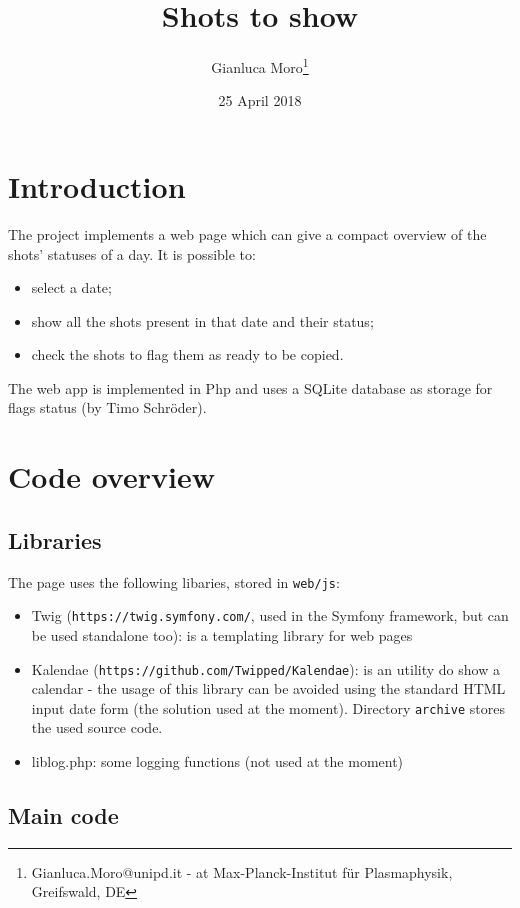\documentclass[12pt]{article}
\title{Shots to show}
\author{Gianluca Moro\footnote{Gianluca.Moro@unipd.it - at Max-Planck-Institut f\"ur Plasmaphysik, Greifswald, DE}}
\date{25 April 2018}
\begin{document}
\maketitle

\section{Introduction}

The project implements a web page which can give a compact overview
of the shots' statuses of a day. It is possible to:
\begin{itemize}
\item select a date;
\item show all the shots present in that date and their status;
\item check the shots to flag them as ready to be copied.
\end{itemize}

The web app is implemented in Php and uses a SQLite database as storage
for flags status (by Timo Schr\"oder).


\section{Code overview}


\subsection{Libraries}

The page uses the following libaries, stored in \texttt{web/js}:
\begin{itemize}
\item Twig (\texttt{https://twig.symfony.com/}, used in the Symfony framework, 
  but can be used standalone too): is a templating library for web pages
\item Kalendae (\texttt{https://github.com/Twipped/Kalendae}):
  is an utility do show a calendar - the usage of this library can be avoided
  using the standard HTML input date form (the solution used at the moment).
  Directory \texttt{archive} stores the used source code.
\item liblog.php: some logging functions (not used at the moment) 
\end{itemize}

\subsection{Main code}
\end{document}
